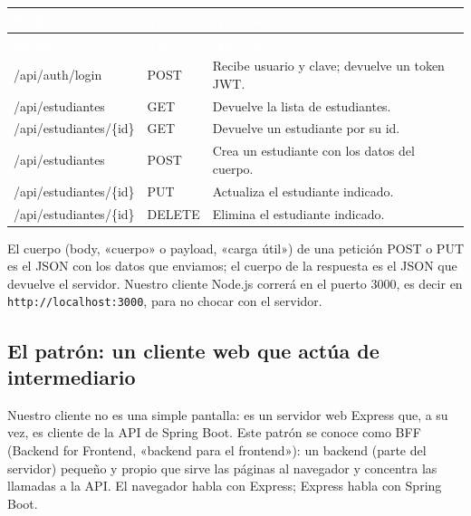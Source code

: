 \documentclass[11pt]{article}
\begin{document}
{\renewcommand{\arraystretch}{1.25}
\begin{longtable}{>{\raggedright\arraybackslash}p{5.6cm} >{\raggedright\arraybackslash}p{2.0cm} >{\raggedright\arraybackslash}p{7.2cm}}
\rowcolor{ndverde}\textcolor{white}{\textbf{Endpoint}} & \textcolor{white}{\textbf{Verbo}} & \textcolor{white}{\textbf{Qué hace}} \\
\endfirsthead
\rowcolor{ndverde}\textcolor{white}{\textbf{Endpoint}} & \textcolor{white}{\textbf{Verbo}} & \textcolor{white}{\textbf{Qué hace}} \\
\endhead
\ttfamily\color{ndverde}/api/auth/login & POST & Recibe usuario y clave; devuelve un token JWT. \\ \hline
\ttfamily\color{ndverde}/api/estudiantes & GET & Devuelve la lista de estudiantes. \\ \hline
\ttfamily\color{ndverde}/api/estudiantes/\{id\} & GET & Devuelve un estudiante por su id. \\ \hline
\ttfamily\color{ndverde}/api/estudiantes & POST & Crea un estudiante con los datos del cuerpo. \\ \hline
\ttfamily\color{ndverde}/api/estudiantes/\{id\} & PUT & Actualiza el estudiante indicado. \\ \hline
\ttfamily\color{ndverde}/api/estudiantes/\{id\} & DELETE & Elimina el estudiante indicado. \\ \hline
\end{longtable}}
El cuerpo (body, «cuerpo» o payload, «carga útil») de una petición POST o PUT es el JSON con los datos que enviamos; el cuerpo de la respuesta es el JSON que devuelve el servidor. Nuestro cliente Node.js correrá en el puerto 3000, es decir en \texttt{http://\allowbreak{}localhost:\allowbreak{}3000}, para no chocar con el servidor.

\subsection{El patrón: un cliente web que actúa de intermediario}
Nuestro cliente no es una simple pantalla: es un servidor web Express que, a su vez, es cliente de la API de Spring Boot. Este patrón se conoce como BFF (Backend for Frontend, «backend para el frontend»): un backend (parte del servidor) pequeño y propio que sirve las páginas al navegador y concentra las llamadas a la API. El navegador habla con Express; Express habla con Spring Boot.
\end{document}
